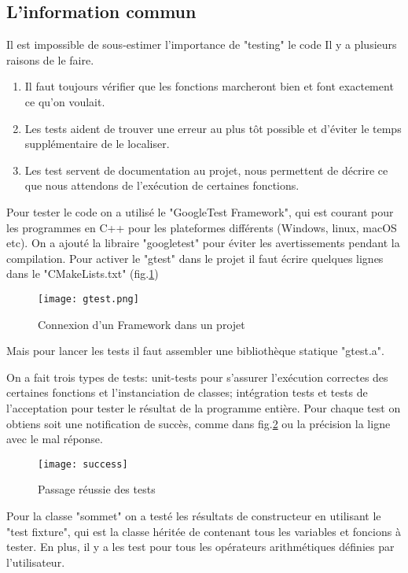 \documentclass[12pt]{article}
\begin{document}
	\subsection{L'information commun}
	Il est impossible de sous-estimer l'importance de "testing" le code Il y a plusieurs raisons de le faire. 
	\begin{enumerate}
		\item{Il faut toujours vérifier que les fonctions marcheront bien et font exactement ce qu'on voulait. }
		\item {Les tests aident de trouver une erreur au plus tôt possible et d'éviter le temps supplémentaire de le localiser.}
		\item{Les test servent de documentation au projet, nous permettent de décrire ce que nous attendons de l'exécution de certaines fonctions.}
	\end{enumerate} 
	Pour tester le code on a utilisé le "GoogleTest Framework", qui est courant pour les programmes en C++ pour les plateformes différents (Windows, linux, macOS etc). On a ajouté la libraire "googletest" pour éviter les avertissements pendant la compilation. Pour activer le "gtest" dans le projet il faut écrire quelques lignes dans le "CMakeLists.txt" (fig.\ref{gtest})
	\begin{figure}[H]
		\centering
		\texttt{[image: gtest.png]}
		\caption{Connexion d'un Framework dans un projet}
		\label{gtest}
	\end{figure}
	
	Mais pour lancer les tests il faut assembler une bibliothèque statique "gtest.a".
	
	On a fait trois types de tests: unit-tests pour s'assurer l'exécution correctes des certaines fonctions et l'instanciation de classes; intégration tests et tests de l'acceptation pour tester le résultat de la programme entière. Pour chaque test on obtiens soit une notification de succès, comme dans fig.\ref{success} ou la précision la ligne avec le mal réponse.
	\begin{figure}[H]
		\centering
		\texttt{[image: success]}
		\caption{Passage réussie des tests}
		\label{success}
	\end{figure}
	Pour la classe "sommet" on a testé les résultats de constructeur en utilisant le "test fixture", qui est la classe héritée de  contenant tous les variables et foncions à tester. En plus, il y a les test pour tous les opérateurs arithmétiques définies par l'utilisateur.
	
\end{document}
